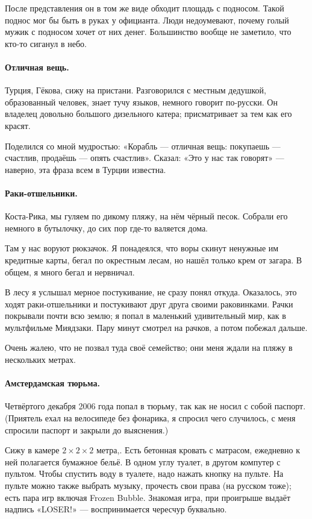 \documentclass{book}
\begin{document}
После представления он в том же виде обходит площадь с подносом.
Такой поднос мог бы быть в руках у официанта.
Люди недоумевают, почему голый мужик с подносом хочет от них денег.
Большинство вообще не заметило, что кто-то сиганул в небо.

\paragraph{Отличная вещь.}
Турция, Гёкова, сижу на пристани.
Разговорился с местным дедушкой,
образованный человек, знает тучу языков, немного говорит по-русски.
Он владелец довольно большого дизельного катера;
присматривает за тем как его красят.

Поделился со мной мудростью:
«Корабль --- отличная вещь: покупаешь --- счастлив, продаёшь --- опять счастлив».
Сказал: «Это у нас так говорят» --- наверно, эта фраза всем в Турции известна.

\paragraph{Раки-отшельники.}
Коста-Рика, мы гуляем по дикому пляжу, на нём чёрный песок.
Собрали его немного в бутылочку, до сих пор где-то валяется дома.

Там у нас воруют рюкзачок.
Я понадеялся, что воры скинут ненужные им кредитные карты, бегал по окрестным лесам, но нашёл только крем от загара.
В общем, я много бегал и нервничал.

В лесу я услышал мерное постукивание, не сразу понял откуда.
Оказалось, это ходят раки-отшельники и постукивают друг друга своими раковинками.
Рачки покрывали почти всю землю;
я попал в маленький удивительный мир, как в мультфильме Миядзаки.
Пару минут смотрел на рачков, а потом побежал дальше.

Очень жалею, что не позвал туда своё семейство; они меня ждали на пляжу в нескольких метрах.

\paragraph{Амстердамская тюрьма.}
Четвёртого декабря 2006 года попал в тюрьму, так как не носил с собой паспорт.
(Приятель ехал на велосипеде без фонарика, я спросил чего случилось, с меня спросили паспорт и закрыли до выяснения.)

Сижу в камере $2{\times}2{\times}2$ метра,.
Есть бетонная кровать с матрасом,
ежедневно к ней полагается бумажное бельё.
В одном углу туалет, в другом компутер с пультом.
Чтобы спустить воду в туалете, надо нажать кнопку на пульте.
На пульте можно также выбрать музыку, прочесть свои права (на русском тоже);
есть пара игр включая Frozen Bubble.
Знакомая игра, при проигрыше выдаёт надпись «LOSER!» --- воспринимается чересчур буквально.
\end{document}
